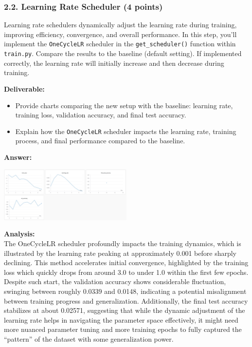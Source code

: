 \documentclass[11pt, oneside]{article}   	%
\begin{document}
\subsubsection*{2.2. Learning Rate Scheduler (4 points)}

Learning rate schedulers dynamically adjust the learning rate during training, improving efficiency, convergence, and overall performance. In this step, you'll implement the \texttt{OneCycleLR} scheduler in the \texttt{get\_scheduler()} function within \texttt{train.py}. Compare the results to the baseline (default setting). If implemented correctly, the learning rate will initially increase and then decrease during training.

\noindent\textbf{Deliverable:}
\begin{itemize}
    \item Provide charts comparing the new setup with the baseline: learning rate, training loss, validation accuracy, and final test accuracy.
    \item Explain how the \texttt{OneCycleLR} scheduler impacts the learning rate, training process, and final performance compared to the baseline.
\end{itemize}

\textbf{Answer:} \\
\begin{center}
    \includegraphics[width=0.5\textwidth]{p2p2_pic/SchedulerChart1.png}
\end{center}

\textbf{Analysis: }
\\
The OneCycleLR scheduler profoundly impacts the training dynamics, which is illustrated by the learning rate peaking at approximately 0.001 before sharply declining. This method accelerates initial convergence, highlighted by the training loss which quickly drops from around 3.0 to under 1.0 within the first few epochs. 
Despite such start, the validation accuracy shows considerable fluctuation, swinging between roughly 0.0339 and 0.0148, indicating a potential misalignment between training progress and generalization. 
Additionally, the final test accuracy stabilizes at about 0.02571, suggesting that while the dynamic adjustment of the learning rate helps in navigating the parameter space effectively, it might need more nuanced parameter tuning and more training epochs to fully captured the ``pattern'' of the dataset with some generalization power.
\end{document}
